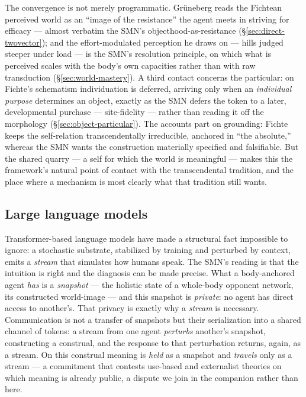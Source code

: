 \documentclass{article}
\begin{document}
The convergence is not merely programmatic.  Gr\"uneberg reads the
Fichtean perceived world as an ``image of the resistance'' the agent meets
in striving for efficacy --- almost verbatim the SMN's
objecthood-as-resistance (\S\ref{sec:direct-twovector}); and the
effort-modulated perception he draws on --- hills judged steeper under
load --- is the SMN's resolution principle, on which what is perceived
scales with the body's own capacities rather than with raw transduction
(\S\ref{sec:world-mastery}).  A third contact concerns the particular: on
Fichte's schematism individuation is deferred, arriving only when an
\emph{individual purpose} determines an object, exactly as the SMN defers
the token to a later, developmental purchase --- site-fidelity --- rather
than reading it off the morphology (\S\ref{sec:object-particular}).  The
accounts part on grounding: Fichte keeps the self-relation
transcendentally irreducible, anchored in ``the absolute,'' whereas the
SMN wants the construction materially specified and falsifiable.  But the
shared quarry --- a self for which the world is meaningful --- makes this
the framework's natural point of contact with the transcendental
tradition, and the place where a mechanism is most clearly what that
tradition still wants.

\subsection{Large language models}\label{sec:rel-contemp-ai}

Transformer-based language models \citep{Vaswani2017Attention} have made a
structural fact impossible to ignore: a stochastic substrate, stabilized by
training and perturbed by context, emits a \emph{stream} that simulates how
humans speak.  The SMN's reading is that the intuition is right and the
diagnosis can be made precise.  What a body-anchored agent \emph{has} is a
\emph{snapshot} --- the holistic state of a whole-body opponent network, its
constructed world-image --- and this snapshot is \emph{private}: no agent has
direct access to another's.  That privacy is exactly why a \emph{stream} is
necessary.  Communication is not a transfer of snapshots but their serialization
into a shared channel of tokens: a stream from one agent \emph{perturbs}
another's snapshot, constructing a construal, and the response to that perturbation
returns, again, as a stream.  On this construal meaning is \emph{held} as a
snapshot and \emph{travels} only as a stream --- a commitment that contests
use-based and externalist theories on which meaning is already public, a dispute
we join in the companion rather than here.
\end{document}
